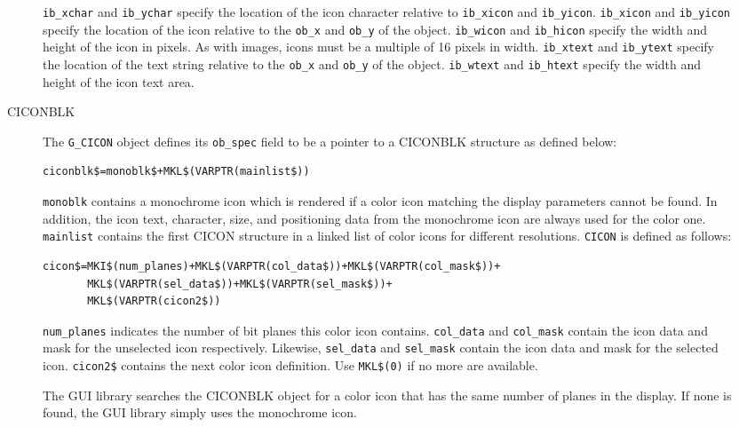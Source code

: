 \begin{description}
\begin{description}
\verb|ib_xchar| and \verb|ib_ychar| specify the location of the icon character
relative to \verb|ib_xicon| and \verb|ib_yicon|. \verb|ib_xicon| and 
\verb|ib_yicon| specify the
location of the icon relative to the \verb|ob_x| and \verb|ob_y| of the object.
\verb|ib_wicon| and \verb|ib_hicon| specify the width and height of the icon in
pixels. As with images, icons must be a multiple of 16 pixels in
width.
\verb|ib_xtext| and \verb|ib_ytext| specify the location of the text string relative
to the \verb|ob_x| and \verb|ob_y| of the object. \verb|ib_wtext| and \verb|ib_htext| specify the
width and height of the icon text area.

\item[CICONBLK]

The \verb|G_CICON| object defines its
\verb|ob_spec| field to be a pointer to a CICONBLK structure as defined
below:

 {\footnotesize
\begin{verbatim}                                                         
ciconblk$=monoblk$+MKL$(VARPTR(mainlist$))
\end{verbatim}}

\verb|monoblk| contains a monochrome icon which is rendered if a color icon
matching the display parameters cannot be found. In addition, the icon
text, character, size, and positioning data from the monochrome icon
are always used for the color one. \verb|mainlist| contains the first
CICON structure in a linked list of color icons for different
resolutions. \verb|CICON| is defined as follows:

 {\footnotesize
\begin{verbatim}                                                         
cicon$=MKI$(num_planes)+MKL$(VARPTR(col_data$))+MKL$(VARPTR(col_mask$))+
       MKL$(VARPTR(sel_data$))+MKL$(VARPTR(sel_mask$))+
       MKL$(VARPTR(cicon2$))
\end{verbatim}}

\verb|num_planes| indicates the number of bit planes this color icon
contains. \verb|col_data| and \verb|col_mask| contain the icon data and 
mask for the unselected icon respectively. Likewise, 
\verb|sel_data| and \verb|sel_mask| contain the icon data and mask for 
the selected icon. \verb|cicon2$| contains
the next color icon definition. Use \verb|MKL$(0)| if no more are available.

The GUI library searches the CICONBLK object for a color icon that has the
same number of planes in the display. If none is found, the GUI library simply
uses the monochrome icon.


\end{description}
\end{description}
